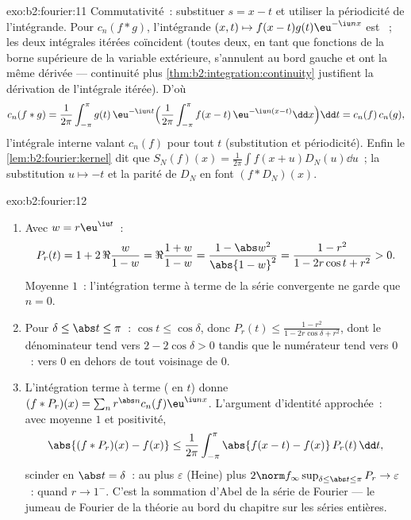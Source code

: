 \begin{solution}{exo:b2:fourier:11}
Commutativité~: substituer $s = x - t$ et utiliser la périodicité de
l'intégrande. Pour $c_n(f * g)$, l'intégrande $(x, t) \mapsto
f(x-t)g(t)\eu^{-\iu nx}$ est ~; les deux intégrales itérées
coïncident (toutes deux, en tant que fonctions de la borne supérieure
de la variable extérieure, s'annulent au bord gauche et ont la même
dérivée --- continuité plus \cref{thm:b2:integration:continuity}
justifient la dérivation de l'intégrale itérée). D'où
\[
c_n(f*g) = \frac{1}{2\pi}\int_{-\pi}^{\pi} g(t)\,\eu^{-\iu nt}
\Bigl(\frac{1}{2\pi}\int_{-\pi}^{\pi}
f(x-t)\,\eu^{-\iu n(x-t)}\dd x\Bigr)\dd t
= c_n(f)\,c_n(g),
\]
l'intégrale interne valant $c_n(f)$ pour tout $t$ (substitution et
périodicité). Enfin le \cref{lem:b2:fourier:kernel} dit que
$S_N(f)(x) = \frac{1}{2\pi}\int f(x+u)D_N(u)\dd u$~; la substitution
$u \mapsto -t$ et la parité de $D_N$ en font $(f * D_N)(x)$.
\end{solution}

\begin{solution}{exo:b2:fourier:12}
\begin{enumerate}
  \item Avec $w = r\eu^{\iu t}$~:
        \[
        P_r(t) = 1 + 2\,\Re\frac{w}{1 - w}
        = \Re\frac{1 + w}{1 - w}
        = \frac{1 - \abs w^2}{\abs{1 - w}^2}
        = \frac{1 - r^2}{1 - 2r\cos t + r^2} > 0 .
        \]
        Moyenne $1$~: l'intégration terme à terme de la série
         convergente ne garde que $n = 0$.
  \item Pour $\delta \leq \abs t \leq \pi$~: $\cos t \leq
        \cos\delta$, donc $P_r(t) \leq \frac{1 - r^2}{1 -
        2r\cos\delta + r^2}$, dont le dénominateur tend vers $2 -
        2\cos\delta > 0$ tandis que le numérateur tend vers $0$~:
         vers $0$ en dehors de tout voisinage de
        $0$.
  \item L'intégration terme à terme ( en $t$)
        donne $(f * P_r)(x) = \sum_n r^{\abs
        n}c_n(f)\eu^{\iu nx}$. L'argument d'identité approchée~:
        avec moyenne $1$ et positivité,
        \[
        \abs{(f*P_r)(x) - f(x)}
        \leq \frac{1}{2\pi}\int_{-\pi}^{\pi}
        \abs{f(x-t) - f(x)}\,P_r(t)\,\dd t ,
        \]
        scinder en $\abs t = \delta$~: au plus $\varepsilon$
        (Heine) plus $2\norm f_\infty\sup_{\delta\leq\abs
        t\leq\pi}P_r \to \varepsilon$~:  quand
        $r \to 1^-$. C'est la sommation d'Abel de la série de
        Fourier --- le jumeau de Fourier de la théorie au bord du
        chapitre sur les séries entières.
\end{enumerate}
\end{solution}

